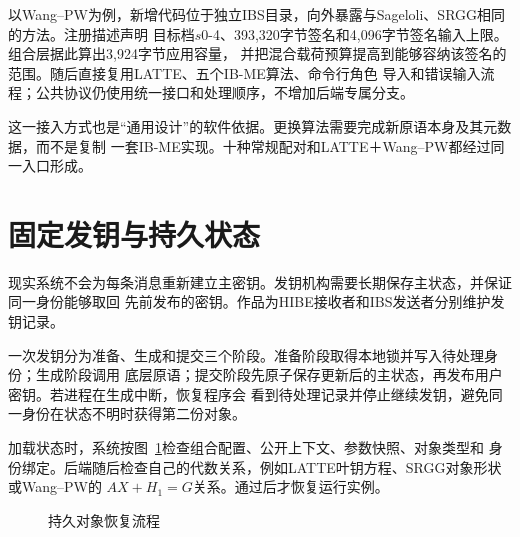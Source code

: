 以Wang--PW为例，新增代码位于独立IBS目录，向外暴露与Sageloli、SRGG相同的方法。注册描述声明
目标档$s0$-4、393,320字节签名和4,096字节签名输入上限。组合层据此算出3,924字节应用容量，
并把混合载荷预算提高到能够容纳该签名的范围。随后直接复用LATTE、五个IB-ME算法、命令行角色
导入和错误输入流程；公共协议仍使用统一接口和处理顺序，不增加后端专属分支。

这一接入方式也是“通用设计”的软件依据。更换算法需要完成新原语本身及其元数据，而不是复制
一套IB-ME实现。十种常规配对和LATTE＋Wang--PW都经过同一入口形成。

\section{固定发钥与持久状态}

现实系统不会为每条消息重新建立主密钥。发钥机构需要长期保存主状态，并保证同一身份能够取回
先前发布的密钥。作品为HIBE接收者和IBS发送者分别维护发钥记录。

一次发钥分为准备、生成和提交三个阶段。准备阶段取得本地锁并写入待处理身份；生成阶段调用
底层原语；提交阶段先原子保存更新后的主状态，再发布用户密钥。若进程在生成中断，恢复程序会
看到待处理记录并停止继续发钥，避免同一身份在状态不明时获得第二份对象。

加载状态时，系统按图~\ref{fig:state-recovery}检查组合配置、公开上下文、参数快照、对象类型和
身份绑定。后端随后检查自己的代数关系，例如LATTE叶钥方程、SRGG对象形状或Wang--PW的
$AX+H_1=G$关系。通过后才恢复运行实例。

\begin{figure}[H]
\centering
{}
\caption{持久对象恢复流程}
\label{fig:state-recovery}
\end{figure}

